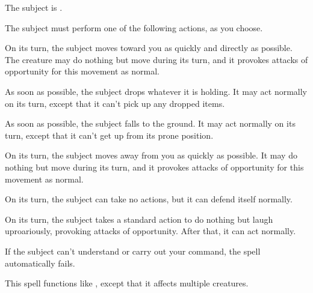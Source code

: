 \begin{spellhealthy}
    The subject is \bewildered.
\end{spellhealthy}
\begin{spellblood}
    The subject must perform one of the following actions, as you choose.
    \par {} On its turn, the subject moves toward you as quickly and directly as possible. The creature may do nothing but move during its turn, and it provokes attacks of opportunity for this movement as normal.
    \par {} As soon as possible, the subject drops whatever it is holding. It may act normally on its turn, except that it can't pick up any dropped items.
    \par {} As soon as possible, the subject falls to the ground. It may act normally on its turn, except that it can't get up from its prone position.
    \par {} On its turn, the subject moves away from you as quickly as possible. It may do nothing but move during its turn, and it provokes attacks of opportunity for this movement as normal.
    \par {} On its turn, the subject can take no actions, but it can defend itself normally.
    \par {} On its turn, the subject takes a standard action to do nothing but laugh uproariously, provoking attacks of opportunity. After that, it can act normally.
\end{spellblood}
\begin{spellnotes}
    If the subject can't understand or carry out your command, the spell automatically fails.
\end{spellnotes}

\begin{spelleffect}
    This spell functions like , except that it affects multiple creatures.
\end{spelleffect}

